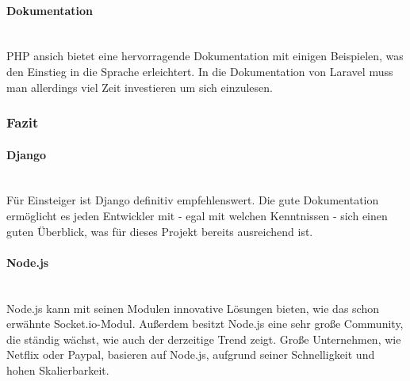 \paragraph{Dokumentation} \mbox{}\\
PHP ansich bietet eine hervorragende Dokumentation mit einigen Beispielen, was den Einstieg in die Sprache erleichtert. In die Dokumentation von Laravel muss man allerdings viel Zeit investieren um sich einzulesen. 

\subsubsection{Fazit}
\paragraph{Django} \mbox{}\\
F\"ur Einsteiger ist Django definitiv empfehlenswert. Die gute Dokumentation erm\"oglicht es jeden Entwickler mit - egal mit welchen Kenntnissen - sich einen guten \"Uberblick, was f\"ur dieses Projekt bereits ausreichend ist.
\paragraph{Node.js} \mbox{}\\
Node.js kann mit seinen Modulen innovative L\"osungen bieten, wie das schon erw\"ahnte Socket.io-Modul. Au{\ss}erdem besitzt Node.js eine sehr gro{\ss}e Community, die st\"andig w\"achst, wie auch der derzeitige Trend zeigt. Gro{\ss}e Unternehmen, wie Netflix oder Paypal, basieren auf Node.js, aufgrund seiner Schnelligkeit und hohen Skalierbarkeit.
